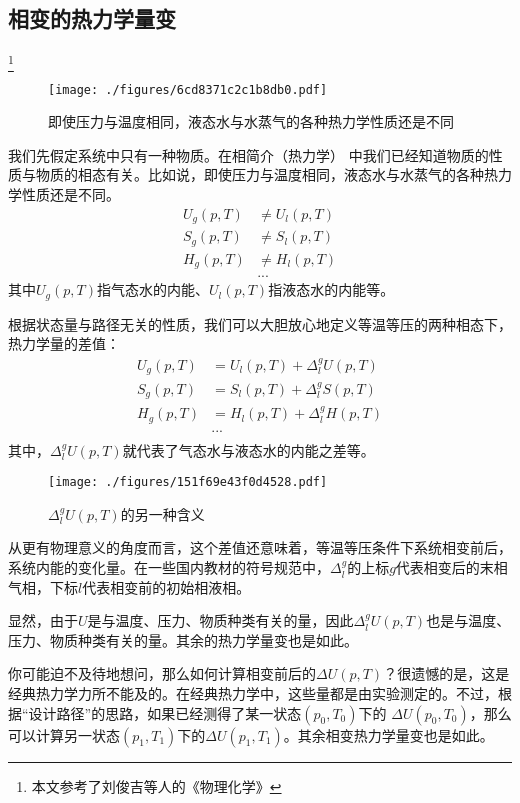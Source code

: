 

\subsection{相变的热力学量变}
\footnote{本文参考了刘俊吉等人的《物理化学》}
\begin{figure}[ht]
\centering
\texttt{[image: ./figures/6cd8371c2c1b8db0.pdf]}
\caption{即使压力与温度相同，液态水与水蒸气的各种热力学性质还是不同} \label{fig_PTTVC2_1}
\end{figure}

我们先假定系统中只有一种物质。在相简介（热力学） 中我们已经知道物质的性质与物质的相态有关。比如说，即使压力与温度相同，液态水与水蒸气的各种热力学性质还是不同。
$$
\begin{aligned}
U_g(p,T) &\ne U_l(p,T)\\
S_g(p,T) &\ne S_l(p,T)\\
H_g(p,T) &\ne H_l(p,T)\\
&...
\end{aligned}
$$
其中$U_g(p,T)$指气态水的内能、$U_l(p,T)$指液态水的内能等。

根据状态量与路径无关的性质，我们可以大胆放心地定义等温等压的两种相态下，热力学量的差值：
$$
\begin{aligned}
U_g(p,T) &= U_l(p,T) + \Delta ^ g_l U (p,T)\\
S_g(p,T) &= S_l(p,T) + \Delta ^ g_l S (p,T)\\
H_g(p,T) &= H_l(p,T) + \Delta ^ g_l H (p,T)\\
&...\\
\end{aligned}
$$
其中，$\Delta ^ g_l U (p,T)$就代表了气态水与液态水的内能之差等。
\begin{figure}[ht]
\centering
\texttt{[image: ./figures/151f69e43f0d4528.pdf]}
\caption{$\Delta ^ g_l U (p,T)$的另一种含义} \label{fig_PTTVC2_2}
\end{figure}
从更有物理意义的角度而言，这个差值还意味着，等温等压条件下系统相变前后，系统内能的变化量。在一些国内教材的符号规范中，$\Delta^g_l$的上标$g$代表相变后的末相气相，下标$l$代表相变前的初始相液相。

显然，由于$U$是与温度、压力、物质种类有关的量，因此$\Delta ^ g_l U (p,T)$也是与温度、压力、物质种类有关的量。其余的热力学量变也是如此。

你可能迫不及待地想问，那么如何计算相变前后的$\Delta U (p,T)$？很遗憾的是，这是经典热力学力所不能及的。在经典热力学中，这些量都是由实验测定的。不过，根据“设计路径”的思路，如果已经测得了某一状态$(p_0,T_0)$下的 $\Delta U (p_0,T_0)$，那么可以计算另一状态$(p_1,T_1)$下的$\Delta U (p_1,T_1)$。其余相变热力学量变也是如此。

